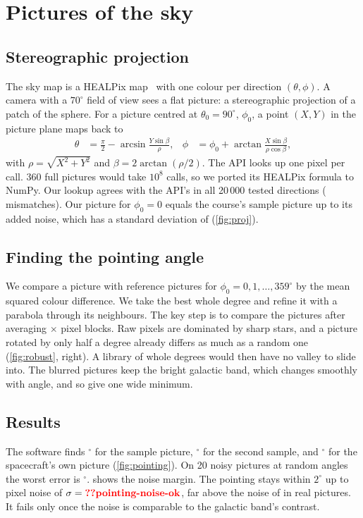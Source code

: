 \documentclass[aps,prd,twocolumn,nofootinbib,floatfix,superscriptaddress]{revtex4-2}
\begin{document}
\section{Pictures of the sky}\label{sec:pictures}
\subsection{Stereographic projection}
The sky map is a HEALPix map~\cite{gorski2005} with one colour per direction $(\theta,\phi)$.
A camera with a $70^\circ$ field of view sees a flat picture: a stereographic projection of a patch of the sphere.
For a picture centred at $\theta_0=90^\circ$, $\phi_0$, a point $(X,Y)$ in the picture plane maps back to
\begin{align}
  \theta &= \frac{\pi}{2}-\arcsin\frac{Y\sin\beta}{\rho}, &
  \phi &= \phi_0+\arctan\frac{X\sin\beta}{\rho\cos\beta},
\end{align}
with $\rho=\sqrt{X^2+Y^2}$ and $\beta=2\arctan(\rho/2)$.
The API looks up one pixel per call.
360 full pictures would take $10^8$ calls, so we ported its HEALPix formula to NumPy.
Our lookup agrees with the API's in all 20\,000 tested directions ( mismatches).
Our picture for $\phi_0=0$ equals the course's sample picture up to its added noise, which has a standard deviation of  (\cref{fig:proj}).

\subsection{Finding the pointing angle}
We compare a picture with reference pictures for $\phi_0=0,1,\ldots,359^\circ$ by the mean squared colour difference.
We take the best whole degree and refine it with a parabola through its neighbours.
The key step is to compare the pictures after averaging $\times$ pixel blocks.
Raw pixels are dominated by sharp stars, and a picture rotated by only half a degree already differs as much as a random one (\cref{fig:robust}, right).
A library of whole degrees would then have no valley to slide into.
The blurred pictures keep the bright galactic band, which changes smoothly with angle, and so give one wide minimum.

\subsection{Results}
The software finds $^\circ$ for the sample picture, $^\circ$ for the second sample, and $^\circ$ for the spacecraft's own picture (\cref{fig:pointing}).
On 20 noisy pictures at random angles the worst error is $^\circ$.
 shows the noise margin.
The pointing stays within $2^\circ$ up to pixel noise of $\sigma=\val{pointing-noise-ok}$, far above the noise of  in real pictures.
It fails only once the noise is comparable to the galactic band's contrast.
\end{document}
